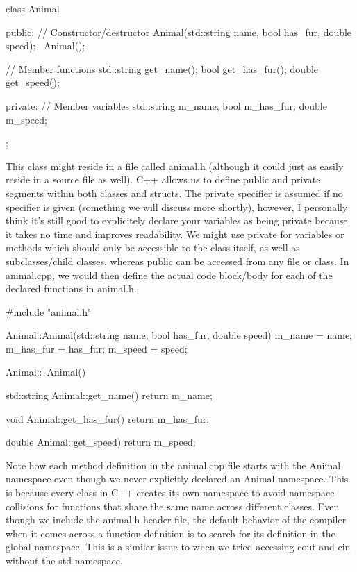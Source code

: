 \documentclass{article}
\begin{document}
\begin{cpplst}
class Animal
{
public:
    // Constructor/destructor
    Animal(std::string name, bool has_fur, double speed);
    ~Animal();

    // Member functions
    std::string get_name();
    bool get_has_fur();
    double get_speed();

private:
    // Member variables
    std::string m_name;
    bool m_has_fur;
    double m_speed;
};
\end{cpplst}

This class might reside in a file called animal.h (although it could just as easily reside in a source file as
well). C++ allows us to define public and private segments within both classes and structs. The private
specifier is assumed if no specifier is given (something we will discuss more shortly), however, I personally
think it's still good to explicitely declare your variables as being private because it takes no time and
improves readability. We might use private for variables or methods which should only be accessible to the
class itself, as well as subclasses/child classes, whereas public can be accessed from any file or class. In
animal.cpp, we would then define the actual code block/body for each of the declared functions in animal.h.

\begin{cpplst}
#include "animal.h"

Animal::Animal(std::string name, bool has_fur, double speed)
{
    m_name = name;
    m_has_fur = has_fur;
    m_speed = speed;
}

Animal::~Animal()
{}

std::string Animal::get_name()
{
    return m_name;
}

void Animal::get_has_fur()
{
    return m_has_fur;
}

double Animal::get_speed)
{
    return m_speed;
}
\end{cpplst}

Note how each method definition in the animal.cpp file starts with the Animal namespace even though we never
explicitly declared an Animal namespace. This is because every class in C++ creates its own namespace to avoid
namespace collisions for functions that share the same name across different classes. Even though we include the
animal.h header file, the default behavior of the compiler when it comes across a function definition is to
search for its definition in the global namespace. This is a similar issue to when we tried accessing cout and
cin without the std namespace.
\end{document}
